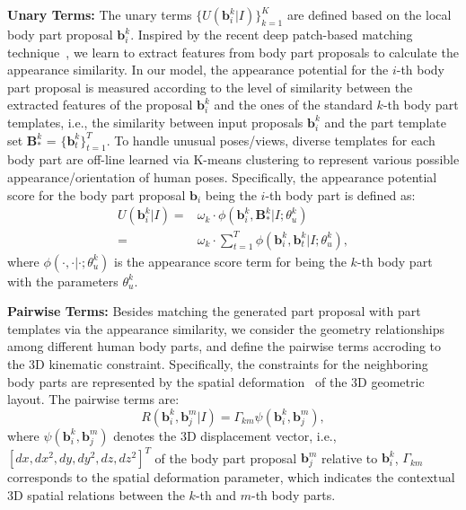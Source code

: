 \documentclass{sig-alternate-05-2015}
\begin{document}
\textbf{Unary Terms:} The unary terms $\{U(\textbf{b}_i^k|I)\}_{k=1}^K$ are defined based on the local body part proposal $\textbf{b}_i^k$. Inspired by the recent deep patch-based matching technique~\cite{mn15cvpr}, we learn to extract features from body part proposals to calculate the appearance similarity. In our model, the appearance potential for the $i$-th body part proposal is measured according to the level of similarity between the extracted features of the proposal $\textbf{b}_i^k$ and the ones of the standard $k$-th body part templates, i.e., the similarity between input proposals $\textbf{b}_i^k$ and the part template set $\mathbf{B}_*^k$ = $\{\mathbf{b}_t^k\}_{t=1}^T$. To handle unusual poses/views, diverse templates for each body part are off-line learned via K-means clustering to represent various possible appearance/orientation of human poses. Specifically, the appearance potential score for the body part proposal $\mathbf{b}_i$ being the $i$-th body part is defined as:
\begin{equation}
\begin{split}
U(\mathbf{b}_i^k|I)=& \omega_k \cdot \phi(\mathbf{b}_i^k, \textbf{B}_*^k|I; \theta_u^k ) \\
=& \omega_k \cdot \sum_{t=1}^T \phi(\mathbf{b}_i^k, \mathbf{b}_t^k|I; \theta_u^k ),
\end{split}
\end{equation}
where $\phi(\cdot, \cdot|\cdot;\theta_u^k)$ is the appearance score term for being the $k$-th body part with the parameters $\theta_u^k$. 

\textbf{Pairwise Terms:} Besides matching the generated part proposal with part templates via the appearance similarity, we consider the geometry relationships among different human body parts, and define the pairwise terms accroding to the 3D kinematic constraint. Specifically, the constraints for the neighboring body parts are represented by the spatial deformation~\cite{dpm10pami} of the 3D geometric layout. The pairwise terms are:
\begin{equation}
R(\textbf{b}_i^k, \textbf{b}_j^m|I)= \Gamma_{km}\psi(\textbf{b}_i^k, \textbf{b}_j^m),
\end{equation}
where $\psi(\mathbf{b}_i^k, \mathbf{b}_j^m)$ denotes the 3D displacement vector, i.e., $[dx, dx^2, dy, dy^2, dz, dz^2]^T$ of the body part proposal $\mathbf{b}_j^m$ relative to $\mathbf{b}_i^k$, $\Gamma_{km}$ corresponds to the spatial deformation parameter, which indicates the contextual 3D spatial relations between the $k$-th and $m$-th body parts.
\end{document}

